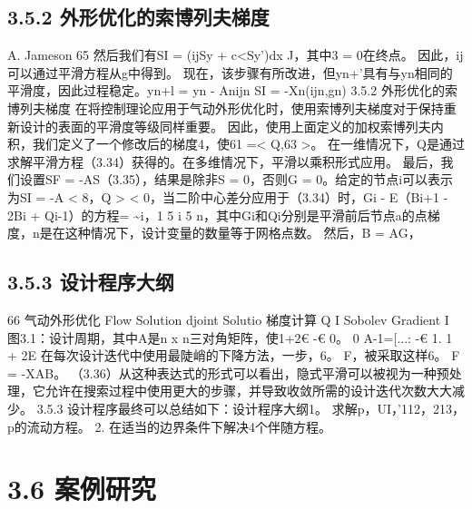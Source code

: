 \documentclass[UTF8,11pt,a4paper,openany,fontset=fandol]{ctexbook}
\begin{document}
\subsection{3.5.2 外形优化的索博列夫梯度}
A. Jameson 65 然后我们有SI = (ijSy + c<Sy')dx J，其中3 = 0在终点。 因此，ij可以通过平滑方程从g中得到。 现在，该步骤有所改进，但yn+'具有与yn相同的平滑度，因此过程稳定。yn+l = yn - Anijn SI = -Xn(ijn,gn) 3.5.2 外形优化的索博列夫梯度 在将控制理论应用于气动外形优化时，使用索博列夫梯度对于保持重新设计的表面的平滑度等级同样重要。 因此，使用上面定义的加权索博列夫内积，我们定义了一个修改后的梯度4，使61 =< Q,63 >。 在一维情况下，Q是通过求解平滑方程（3.34）获得的。在多维情况下，平滑以乘积形式应用。 最后，我们设置SF = -AS（3.35），结果是除非S = 0，否则G = 0。给定的节点i可以表示为SI = -A < 8，Q > < 0，当二阶中心差分应用于（3.34）时，Gi - E（Bi+1 - 2Bi + Qi-1）的方程= \textasciitilde{}i，1 5 i 5 n，其中Gi和Qi分别是平滑前后节点a的点梯度，n是在这种情况下，设计变量的数量等于网格点数。 然后，B = AG，

\subsection{3.5.3 设计程序大纲}
66 气动外形优化 Flow Solution djoint Solutio 梯度计算 Q I Sobolev Gradient I 图3.1：设计周期，其中A是n x n三对角矩阵，使1+2€ -€ 0。 0 A-1=[...: -€ 1. 1 + 2E 在每次设计迭代中使用最陡峭的下降方法，一步，6。 F，被采取这样6。 F = -XAB。 （3.36）从这种表达式的形式可以看出，隐式平滑可以被视为一种预处理，它允许在搜索过程中使用更大的步骤，并导致收敛所需的设计迭代次数大大减少。 3.5.3 设计程序最终可以总结如下：设计程序大纲1。 求解p，UI，'112，213，p的流动方程。 2. 在适当的边界条件下解决4个伴随方程。

\section{3.6 案例研究}
\end{document}
